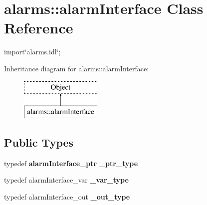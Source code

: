 \section{alarms\+:\+:alarm\+Interface Class Reference}
\label{interfacealarms_1_1alarmInterface}


{\ttfamily import\char`\"{}alarms.\+idl\char`\"{};}

Inheritance diagram for alarms\+:\+:alarm\+Interface\+:\begin{figure}[H]
\begin{center}
\leavevmode
\includegraphics[height=2.000000cm]{interfacealarms_1_1alarmInterface}
\end{center}
\end{figure}
\subsection*{Public Types}
\begin{DoxyCompactItemize}
\item 
typedef {\bf alarm\+Interface\+\_\+ptr} {\bfseries \+\_\+ptr\+\_\+type}\label{interfacealarms_1_1alarmInterface_a282eec0bd0264ac2d1b4c2211abc231a}

\item 
typedef alarm\+Interface\+\_\+var {\bfseries \+\_\+var\+\_\+type}\label{interfacealarms_1_1alarmInterface_a7310eea9ea9e14c64c4796238e527880}

\item 
typedef alarm\+Interface\+\_\+out {\bfseries \+\_\+out\+\_\+type}\label{interfacealarms_1_1alarmInterface_a8d6587d0150492085cc8abff7fc4832c}

\end{DoxyCompactItemize}
